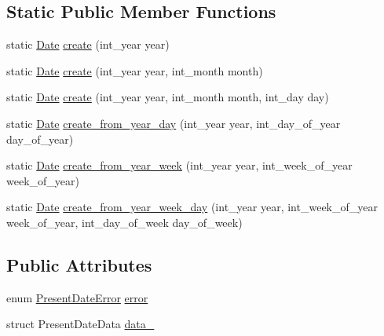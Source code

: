 \subsection*{\-Static \-Public \-Member \-Functions}
\begin{DoxyCompactItemize}
\item 
static \hyperlink{structDate}{\-Date} \hyperlink{structDate_af6a6aa2e75464311dc7eee91e25aee47}{create} (int\-\_\-year year)
\item 
static \hyperlink{structDate}{\-Date} \hyperlink{structDate_a0b1280e69ec6310ec8cdfb730e8dd7f6}{create} (int\-\_\-year year, int\-\_\-month month)
\item 
static \hyperlink{structDate}{\-Date} \hyperlink{structDate_ae0bcc2332237bf0f5b57ed646a00e6ac}{create} (int\-\_\-year year, int\-\_\-month month, int\-\_\-day day)
\item 
static \hyperlink{structDate}{\-Date} \hyperlink{structDate_afed458a3a1ff055cebdbd153bb00d5a4}{create\-\_\-from\-\_\-year\-\_\-day} (int\-\_\-year year, int\-\_\-day\-\_\-of\-\_\-year day\-\_\-of\-\_\-year)
\item 
static \hyperlink{structDate}{\-Date} \hyperlink{structDate_a1758de1f6dbead95e0728032cb05a6dd}{create\-\_\-from\-\_\-year\-\_\-week} (int\-\_\-year year, int\-\_\-week\-\_\-of\-\_\-year week\-\_\-of\-\_\-year)
\item 
static \hyperlink{structDate}{\-Date} \hyperlink{structDate_a282993d00829e727eac88615cb2f1146}{create\-\_\-from\-\_\-year\-\_\-week\-\_\-day} (int\-\_\-year year, int\-\_\-week\-\_\-of\-\_\-year week\-\_\-of\-\_\-year, int\-\_\-day\-\_\-of\-\_\-week day\-\_\-of\-\_\-week)
\end{DoxyCompactItemize}
\subsection*{\-Public \-Attributes}
\begin{DoxyCompactItemize}
\item 
enum \hyperlink{date_8h_a42798e6b91456e88f492437d3e826c0b}{\-Present\-Date\-Error} \hyperlink{structDate_adb2a42cb857f6462788b856b2f60cfb2}{error}
\item 
struct \-Present\-Date\-Data \hyperlink{structDate_a15a7ce699435bf3c9c60bfff5e1806de}{data\-\_\-}
\end{DoxyCompactItemize}
